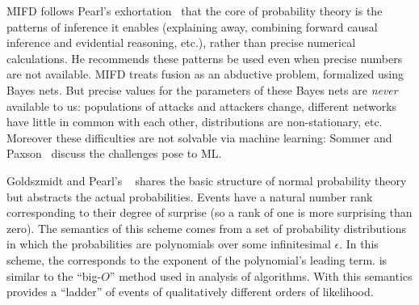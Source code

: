 
MIFD
follows Pearl's exhortation~ that the core of probability theory is
the patterns of inference it enables (explaining away, combining forward causal
inference and evidential reasoning, etc.), rather than precise numerical
calculations.  He recommends these patterns be used even when precise numbers are
not available.
MIFD treats
\ids fusion as an abductive problem, formalized using Bayes nets.
But precise values for the parameters of these Bayes nets
are \emph{never} available to us: populations of
attacks and attackers change, different networks have little in common with each other, distributions are
non-stationary, etc.  Moreover these difficulties are not solvable via machine learning:
Sommer and Paxson~ discuss the challenges \idses pose to ML.

Goldszmidt and
Pearl's \zplus{}~
shares the
basic structure of normal probability theory but abstracts the actual
probabilities.
Events have a natural number rank \tkappa{}
corresponding to their degree of surprise (so a rank of one is more surprising
than zero). The semantics of this scheme comes from a set of probability
distributions in which the probabilities are polynomials over some infinitesimal
$\epsilon$. In this scheme, the \tkappa{} corresponds to the exponent
of the polynomial's leading term.
\zplus is similar to the ``big-$O$'' method used
in analysis of algorithms.
With this semantics \zplus{}
provides a ``ladder'' of events of qualitatively different
orders of likelihood.

